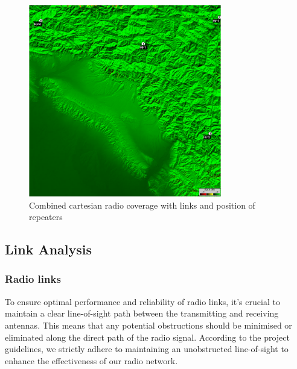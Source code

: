 \begin{figure}[h]
    \centering
    \includegraphics[width=0.75\textwidth]{Images/Final area coverage.png}
    \caption{Combined cartesian radio coverage with links and position of repeaters}
    \label{fig:CCradCov}
\end{figure}

\subsection{Link Analysis}
\subsubsection{Radio links}
To ensure optimal performance and reliability of radio links, it's crucial to maintain a clear line-of-sight path between the transmitting and receiving antennas.
This means that any potential obstructions should be minimised or eliminated along the direct path of the radio signal.
According to the project guidelines, we strictly adhere to maintaining an unobstructed line-of-sight to enhance the effectiveness of our radio network.

